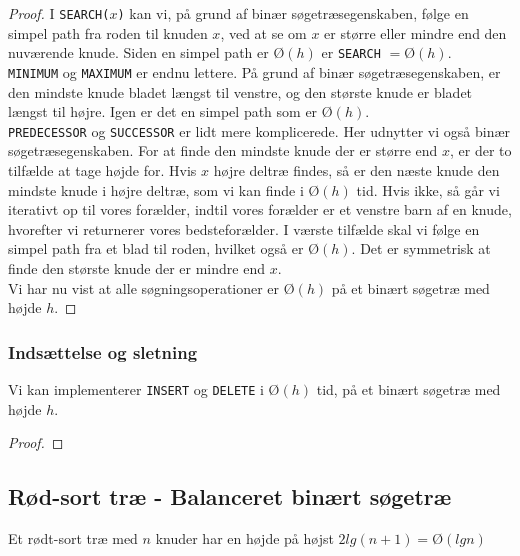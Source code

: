 \begin{proof}
  I \texttt{SEARCH($x$)} kan vi, på grund af binær søgetræsegenskaben, følge en simpel path fra roden til knuden $x$, ved at se om $x$ er større eller mindre end den nuværende knude. Siden en simpel path er $Ø(h)$ er \texttt{SEARCH} $= Ø(h)$.\\

  \texttt{MINIMUM} og \texttt{MAXIMUM} er endnu lettere. På grund af binær søgetræsegenskaben, er den mindste knude bladet længst til venstre, og den største knude er bladet længst til højre. Igen er det en simpel path som er $Ø(h)$.\\

  \texttt{PREDECESSOR} og \texttt{SUCCESSOR} er lidt mere komplicerede. Her udnytter vi også binær søgetræsegenskaben. For at finde den mindste knude der er større end $x$, er der to tilfælde at tage højde for. Hvis $x$ højre deltræ findes, så er den næste knude den mindste knude i højre deltræ, som vi kan finde i $Ø(h)$ tid. Hvis ikke, så går vi iterativt op til vores forælder, indtil vores forælder er et venstre barn af en knude, hvorefter vi returnerer vores bedsteforælder. I værste tilfælde skal vi følge en simpel path fra et blad til roden, hvilket også er $Ø(h)$. Det er symmetrisk at finde den største knude der er mindre end $x$.\\

  Vi har nu vist at alle søgningsoperationer er $Ø(h)$ på et binært søgetræ med højde $h$.
\end{proof}

\subsubsection*{Indsættelse og sletning}

\begin{theorem}
  Vi kan implementerer \texttt{INSERT} og \texttt{DELETE} i $Ø(h)$ tid, på et binært søgetræ med højde $h$.
\end{theorem}

\begin{proof}
  
\end{proof}

\subsection{Rød-sort træ - Balanceret binært søgetræ}

\begin{lemma}
  Et rødt-sort træ med $n$ knuder har en højde på højst $2lg(n+1) = Ø(lgn)$
\end{lemma}


